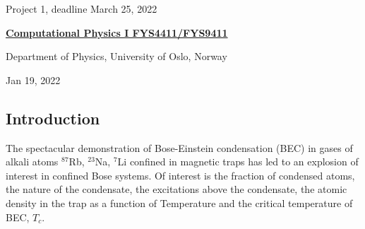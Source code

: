 \documentclass[%
oneside,                 %
final,                   %
10pt]{article}
\begin{document}

\newcommand{\exercisesection}[1]{\subsection*{#1}}






\thispagestyle{empty}

\begin{center}
{\LARGE\bf
\begin{spacing}{1.25}
Project 1, deadline  March 25, 2022 
\end{spacing}
}
\end{center}


\begin{center}
{\bf \href{{http://www.uio.no/studier/emner/matnat/fys/FYS4411/index-eng.html}}{Computational Physics I FYS4411/FYS9411}}
\end{center}

    \begin{center}
\centerline{{\small Department of Physics, University of Oslo, Norway}}
\end{center}
    

\begin{center}
Jan 19, 2022
\end{center}

\vspace{1cm}


\subsection{Introduction}

 The spectacular demonstration of Bose-Einstein condensation (BEC) in gases of
 alkali atoms $^{87}$Rb, $^{23}$Na, $^7$Li confined in magnetic
 traps has led to an explosion of interest in
 confined Bose systems. Of interest is the fraction of condensed atoms, the
 nature of the condensate, the excitations above the condensate, the atomic
 density in the trap as a function of Temperature and the critical temperature of BEC,
 $T_c$. 
\end{document}

